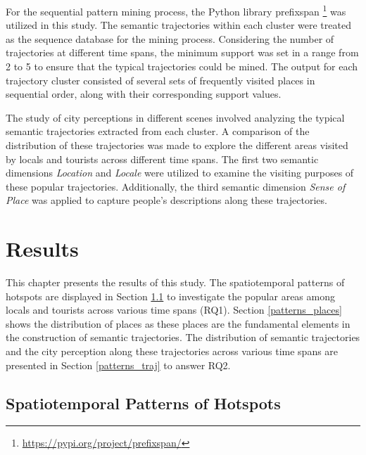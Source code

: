 \documentclass{article}
\theoremstyle{definition}
\theoremstyle{remark}
\begin{document}
For the sequential pattern mining process, the Python library prefixspan \footnote{\url{https://pypi.org/project/prefixspan/}} was utilized in this study. The semantic trajectories within each cluster were treated as the sequence database for the mining process. Considering the number of trajectories at different time spans, the minimum support was set in a range from 2 to 5 to ensure that the typical trajectories could be mined. The output for each trajectory cluster consisted of several sets of frequently visited places in sequential order, along with their corresponding support values.

The study of city perceptions in different scenes involved analyzing the typical semantic trajectories extracted from each cluster. A comparison of the distribution of these trajectories was made to explore the different areas visited by locals and tourists across different time spans. The first two semantic dimensions \textit{Location} and \textit{Locale} were utilized to examine the visiting purposes of these popular trajectories. Additionally, the third semantic dimension \textit{Sense of Place} was applied to capture people's descriptions along these trajectories.

\clearpage

\section{Results}
This chapter presents the results of this study. The spatiotemporal patterns of hotspots are displayed in Section \ref{patterns_hotspots} to investigate the popular areas among locals and tourists across various time spans (RQ1). Section \ref{patterns_places} shows the distribution of places as these places are the fundamental elements in the construction of semantic trajectories. The distribution of semantic trajectories and the city perception along these trajectories across various time spans are presented in Section \ref{patterns_traj} to answer RQ2.

\subsection{Spatiotemporal Patterns of Hotspots} \label{patterns_hotspots}
\end{document}
